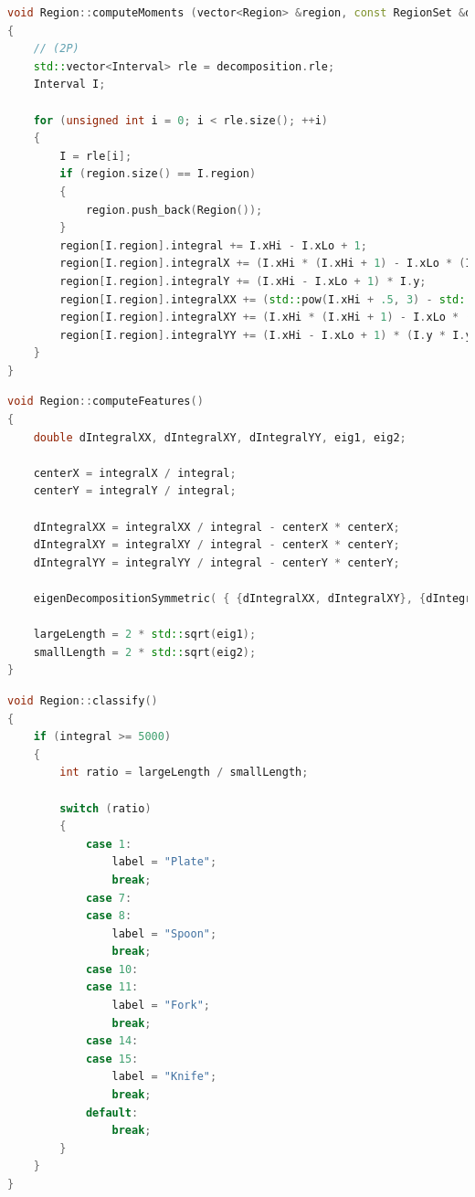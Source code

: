 \documentclass{ezb}
\begin{document}
\begin{lstlisting}[language=C++, caption=Auxiliary routine for group regions]
void Region::computeMoments (vector<Region> &region, const RegionSet &decomposition)
{
	// (2P)
	std::vector<Interval> rle = decomposition.rle;
	Interval I;
	
	for (unsigned int i = 0; i < rle.size(); ++i)
	{
		I = rle[i];
		if (region.size() == I.region)
		{
			region.push_back(Region());
		}
		region[I.region].integral += I.xHi - I.xLo + 1;
		region[I.region].integralX += (I.xHi * (I.xHi + 1) - I.xLo * (I.xLo - 1)) * .5;
		region[I.region].integralY += (I.xHi - I.xLo + 1) * I.y;
		region[I.region].integralXX += (std::pow(I.xHi + .5, 3) - std::pow(I.xLo - .5, 3)) / 3.0;
		region[I.region].integralXY += (I.xHi * (I.xHi + 1) - I.xLo * (I.xLo - 1)) * I.y * .5;
		region[I.region].integralYY += (I.xHi - I.xLo + 1) * (I.y * I.y + 1.0 / 12.0);
	}
}
\end{lstlisting}
\newpage
\begin{lstlisting}[language=C++, caption=Compute center and inertial axes from the second order moments]
void Region::computeFeatures()
{
	double dIntegralXX, dIntegralXY, dIntegralYY, eig1, eig2;

	centerX = integralX / integral;
	centerY = integralY / integral;

	dIntegralXX = integralXX / integral - centerX * centerX;
	dIntegralXY = integralXY / integral - centerX * centerY;
	dIntegralYY = integralYY / integral - centerY * centerY;

	eigenDecompositionSymmetric( { {dIntegralXX, dIntegralXY}, {dIntegralXY, dIntegralYY} }, mainAxis, eig1, eig2);

	largeLength = 2 * std::sqrt(eig1);
	smallLength = 2 * std::sqrt(eig2);
}
\end{lstlisting}

\begin{lstlisting}[language=C++, caption=Determine label from area and inertial axes]
void Region::classify()
{
	if (integral >= 5000)
	{
		int ratio = largeLength / smallLength;

		switch (ratio)
		{
			case 1:
				label = "Plate";
				break;
			case 7:
			case 8:
				label = "Spoon";
				break;
			case 10:
			case 11:
				label = "Fork";
				break;
			case 14:
			case 15:
				label = "Knife";
				break;
			default:
				break;
		}
	}
}
\end{lstlisting}

\newpage
\end{document}
